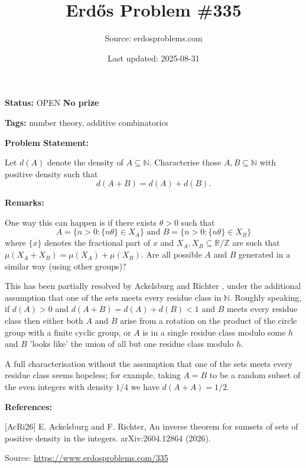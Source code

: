 \documentclass{article}
\title{Erd\H{o}s Problem \#335}
\date{Last updated: 2025-08-31}
\author{Source: erdosproblems.com}
\begin{document}
\maketitle

\noindent\textbf{Status:} OPEN \quad \textbf{No prize}

\noindent\textbf{Tags:} number theory, additive combinatorics

\medskip
\noindent\textbf{Problem Statement:}

Let $d(A)$ denote the density of $A\subseteq \mathbb{N}$. Characterise those $A,B\subseteq \mathbb{N}$ with positive density such that\[d(A+B)=d(A)+d(B).\]

\bigskip
\noindent\textbf{Remarks:}

One way this can happen is if there exists $\theta>0$ such that\[A=\{ n>0 : \{ n\theta\} \in X_A\}\textrm{ and }B=\{ n>0 : \{n\theta\} \in X_B\}\]where $\{x\}$ denotes the fractional part of $x$ and $X_A,X_B\subseteq \mathbb{R}/\mathbb{Z}$ are such that $\mu(X_A+X_B)=\mu(X_A)+\mu(X_B)$. Are all possible $A$ and $B$ generated in a similar way (using other groups)?

This has been partially resolved by Ackelsburg and Richter \cite{AcRi26}, under the additional assumption that one of the sets meets every residue class in $\mathbb{N}$. Roughly speaking, if $d(A)>0$ and $d(A+B)=d(A)+d(B)<1$ and $B$ meets every residue class then either both $A$ and $B$ arise from a rotation on the product of the circle group with a finite cyclic group, or $A$ is in a single residue class modulo some $h$ and $B$ 'looks like' the union of all but one residue class modulo $h$.

A full characterisation without the assumption that one of the sets meets every residue class seems hopeless; for example, taking $A=B$ to be a random subset of the even integers with density $1/4$ we have $d(A+A)=1/2$.

\bigskip
\noindent\textbf{References:}

[AcRi26] E. Ackelsburg and F. Richter, An inverse theorem for sumsets of sets of positive density in the integers. arXiv:2604.12864 (2026).

\bigskip
\noindent\small{Source: \url{https://www.erdosproblems.com/335}}
\end{document}
